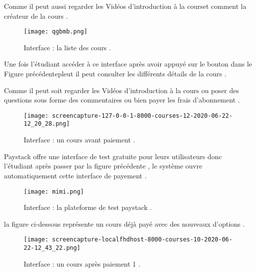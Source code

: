 \medskip

Comme  il peut aussi regarder les Vidéos d'introduction à la courset comment la créateur de la cours .
\bigskip
\bigskip
\bigskip
\begin{figure}[ht]
	\centering
	\texttt{[image: qgbmb.png]}
	\caption{Interface : la liste des cours .}
	\label{fig:Interface : la liste des cours }
\end{figure}
\FloatBarrier
\bigskip
\bigskip
\bigskip
Une fois l'étudiant accéder  à ce interface  après avoir appuyé sur le bouton dans le Figure précédentepleut il peut consulter les différents détails de la cours .

\medskip

 Comme il peut soit regarder les Vidéos d'introduction à la cours ou poser des questions sous forme des commentaires  ou bien payer les frais d'abonnement .
\begin{figure}[ht]
	\centering
	\texttt{[image: screencapture-127-0-0-1-8000-courses-12-2020-06-22-12\_20\_28.png]}
	\caption{Interface : un cours avant paiement .}
	\label{fig:Interface :un cours avant paiement }
\end{figure}
\FloatBarrier
Paystack offre une interface de test gratuite pour leurs utilisateurs
donc l'étudiant après passer par la figure précédente , le système ouvre automatiquement cette interface de payement .
\begin{figure}[ht]
	\centering
	\texttt{[image: mimi.png]}
	\caption{Interface : la plateforme de test  paystack .}
	\label{fig:Interface : la plateforme de test  paystack }
\end{figure}
\FloatBarrier
la figure ci-dessous représente un cours déjà payé avec des nouveaux d'options .
\begin{figure}[ht]
	\centering
	\texttt{[image: screencapture-localfhdhost-8000-courses-10-2020-06-22-12\_43\_22.png]}
	\caption{Interface : un cours après paiement 1 .}
	\label{fig:Interface :un cours après paiement 1}
\end{figure}
\FloatBarrier


